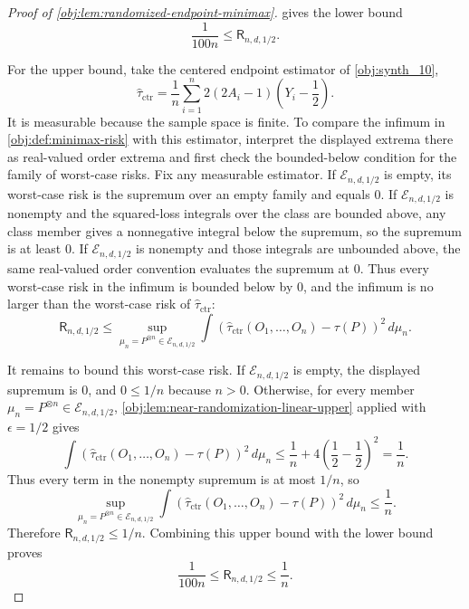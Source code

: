 \begin{proof}[Proof of \cref{obj:lem:randomized-endpoint-minimax}]
 gives the lower bound
\[
\frac1{100n}\le \mathsf R_{n,d,1/2}.
\]

For the upper bound, take the centered endpoint estimator of \cref{obj:synth_10},
\[
\widehat\tau_{\mathrm{ctr}}
=
\frac1n\sum_{i=1}^n
2(2A_i-1)\left(Y_i-\frac12\right).
\]
It is measurable because the sample space is finite. To compare the infimum in \cref{obj:def:minimax-risk} with this estimator, interpret the displayed extrema there as real-valued order extrema and first check the bounded-below condition for the family of worst-case risks. Fix any measurable estimator. If \(\mathcal E_{n,d,1/2}\) is empty, its worst-case risk is the supremum over an empty family and equals \(0\). If \(\mathcal E_{n,d,1/2}\) is nonempty and the squared-loss integrals over the class are bounded above, any class member gives a nonnegative integral below the supremum, so the supremum is at least \(0\). If \(\mathcal E_{n,d,1/2}\) is nonempty and those integrals are unbounded above, the same real-valued order convention evaluates the supremum at \(0\). Thus every worst-case risk in the infimum is bounded below by \(0\), and the infimum is no larger than the worst-case risk of \(\widehat\tau_{\mathrm{ctr}}\):
\[
\mathsf R_{n,d,1/2}
\le
\sup_{\mu_n=P^{\otimes n}\in\mathcal E_{n,d,1/2}}
\int
\left(\widehat\tau_{\mathrm{ctr}}(O_1,\ldots,O_n)-\tau(P)\right)^2
\,d\mu_n .
\]

It remains to bound this worst-case risk. If \(\mathcal E_{n,d,1/2}\) is empty, the displayed supremum is \(0\), and \(0\le 1/n\) because \(n>0\). Otherwise, for every member \(\mu_n=P^{\otimes n}\in\mathcal E_{n,d,1/2}\), \cref{obj:lem:near-randomization-linear-upper} applied with \(\epsilon=1/2\) gives
\[
\int
\left(\widehat\tau_{\mathrm{ctr}}(O_1,\ldots,O_n)-\tau(P)\right)^2
\,d\mu_n
\le
\frac1n+4\left(\frac12-\frac12\right)^2
=
\frac1n .
\]
Thus every term in the nonempty supremum is at most \(1/n\), so
\[
\sup_{\mu_n=P^{\otimes n}\in\mathcal E_{n,d,1/2}}
\int
\left(\widehat\tau_{\mathrm{ctr}}(O_1,\ldots,O_n)-\tau(P)\right)^2
\,d\mu_n
\le \frac1n .
\]
Therefore \(\mathsf R_{n,d,1/2}\le 1/n\). Combining this upper bound with the lower bound proves
\[
\frac1{100n}\le \mathsf R_{n,d,1/2}\le \frac1n .
\]
\end{proof}
